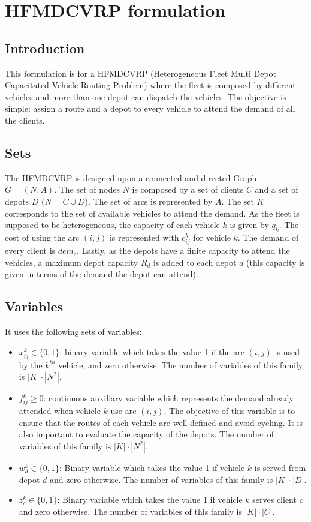 \documentclass[preprint,review,12pt]{elsarticle}
\begin{document}
\section{HFMDCVRP formulation}

\subsection{Introduction}
This formulation is for a HFMDCVRP (Heterogeneous Fleet Multi Depot Capacitated Vehicle Routing Problem) where the fleet is composed by different vehicles and more than one depot can dispatch the vehicles. The objective is simple: assign a route and a depot to every vehicle  to attend the demand of all the clients.

\subsection{Sets}
The HFMDCVRP is designed upon a connected and directed Graph $G = (N,A)$. The set of nodes $N$ is composed by a set of clients $C$ and a set of depots $D$ ($N = C \cup D$). The set of arcs is represented by $A$. The set $K$ corresponds to the set of available vehicles to attend the demand. As the fleet is supposed to be heterogeneous, the capacity of each vehicle $k$ is given by $q_k$. The cost of using the arc $(i,j)$ is represented with $c_{ij}^k$ for vehicle $k$. The demand of every client is $dem_c$. Lastly, as the depots have a finite capacity to attend the vehicles, a maximum depot capacity $R_d$ is added to each depot $d$ (this capacity is given in terms of the demand the depot can attend).

\subsection{Variables}
It uses the following sets of variables:

\begin{itemize}
	\item $x_{ij}^k \in \{0,1\}$: binary variable which takes the value 1 if the arc $(i,j)$ is used by the $k^{th}$ vehicle, and zero otherwise. The number of variables of this family is $|K| \cdot |N^2|$.
	\item $f_{ij}^k \geq 0$: continuous auxiliary variable which represents the demand already attended when vehicle $k$ use arc $(i,j)$. The objective of this variable is to ensure that the routes of each vehicle are well-defined and avoid cycling. It is also important to evaluate the capacity of the depots. The number of variables of this family is $|K| \cdot |N^2|$.
	\item  $w_d^k \in  \{0,1\}$: Binary variable which takes the value 1 if vehicle $k$ is served from depot $d$ and zero otherwise. The number of variables of this family is $|K| \cdot |D|$.
	\item $z_{c}^k \in  \{0,1\}$: Binary variable which takes the value 1 if vehicle $k$ serves client $c$ and zero otherwise. The number of variables of this family is $|K| \cdot |C|$.
\end{itemize}
\end{document}
